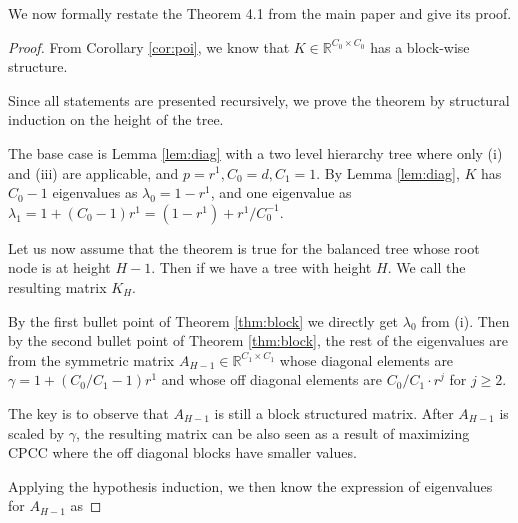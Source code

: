 We now formally restate the Theorem 4.1 from the main paper and give its proof.

\balanced*


\begin{proof}

    From Corollary \ref{cor:poi}, we know that $K \in \mathbb{R}^{C_0 \times C_0}$ has a block-wise structure. 

    Since all statements are presented recursively, we prove the theorem by structural induction on the height of the tree.

    The base case is Lemma \ref{lem:diag} with a two level hierarchy tree where only (i) and (iii) are applicable, and $p = r^1, C_0 = d, C_1 = 1$. By Lemma \ref{lem:diag}, $K$ has $C_0 - 1$ eigenvalues as $\lambda_0 = 1 - r^1$, and one eigenvalue as $\lambda_1 = 1 + (C_0 - 1)r^1 = (1 - r^1) + r^1 / C_0^{-1}$.

    Let us now assume that the theorem is true for the balanced tree whose root node is at height $H-1$. Then if we have a tree with height $H$. We call the resulting matrix $K_H$. 
    
    By the first bullet point of Theorem \ref{thm:block} we directly get $\lambda_0$ from (i). Then by the second bullet point of Theorem \ref{thm:block}, the rest of the eigenvalues are from the symmetric matrix $A_{H-1} \in \mathbb{R}^{C_1 \times C_1}$ whose diagonal elements are $\gamma = 1 + (C_0/C_1 - 1)r^1$ and whose off diagonal elements are $C_0/C_1 \cdot r^j$ for $j \geq 2$. 
    
    The key is to observe that $A_{H-1}$ is still a block structured matrix. After $A_{H-1}$ is scaled by $\gamma$, the resulting matrix can be also seen as a result of maximizing CPCC where the off diagonal blocks have smaller values. 

    Applying the hypothesis induction, we then know the expression of eigenvalues for $A_{H-1}$ as


\end{proof}
